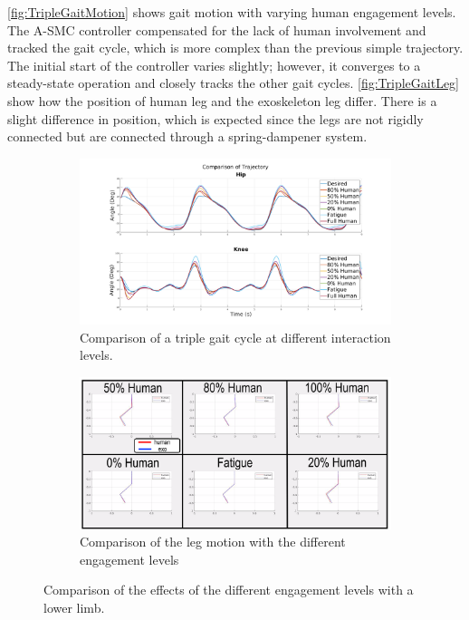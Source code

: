 \autoref{fig:TripleGaitMotion} shows gait motion with varying human engagement levels. The A-SMC controller compensated for the lack of human involvement and tracked the gait cycle, which is more complex than the previous simple trajectory. The initial start of the controller varies slightly; however, it converges to a steady-state operation and closely tracks the other gait cycles. \autoref{fig:TripleGaitLeg} show how the position of human leg and the exoskeleton leg differ. There is a slight difference in position, which is expected since the legs are not rigidly connected but are connected through a spring-dampener system.  




\begin{figure}
    \centering
    \begin{subfigure}{\linewidth}
        \centering
        \includegraphics[width=\columnwidth]{images/controllers/gait/traj.png}
        \caption[Comparison of a Triple Gait Cycle]{Comparison of a triple gait cycle at different interaction levels.}
        \label{fig:TripleGaitJoint}
    \end{subfigure}
        \begin{subfigure}{\linewidth}
        \centering
        \includegraphics[width=\columnwidth]{images/controllers/gait/leg_frame_annotated.png}
        \caption[Engagement Levels of Leg Motion]{Comparison of the leg motion with the different engagement levels}
        \label{fig:TripleGaitLeg}
    \end{subfigure}
    \caption[Effects of the Different Engagement Levels]{Comparison of the effects of the different engagement levels with a lower limb.}
    \label{fig:TripleGaitMotion}
\end{figure}









